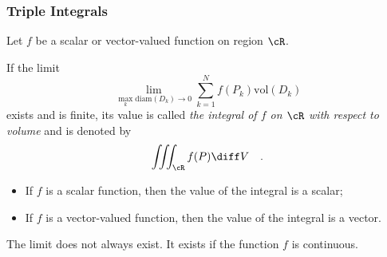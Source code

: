 \begin{frame}
\frametitle{Triple Integrals}
Let $f$ be a scalar or vector-valued function on region $\cR$.
\begin{definition}
If the limit
$$\lim_{\max_k\text{diam}(D_k) \to 0}  \sum_{k=1}^{N} f(P_k)\text{vol}(D_k)$$
exists and is finite, its value is called  \emph{the integral of $f$ on $\cR$ with respect to volume} and is denoted by
\[
\iiint_{\cR} f(P) \diff V\quad .
\]
\end{definition}
\begin{itemize}
\item<2-> If $f$ is a scalar function, then the value of the integral is a scalar;
\item<3-> If $f$ is a vector-valued function, then the value of the integral is a vector.
\end{itemize}
The limit does not always exist. It exists if the function $f$ is continuous.
\end{frame}